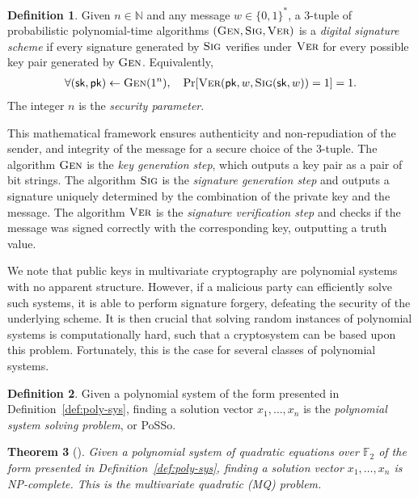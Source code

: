 \documentclass[12pt, a4paper, oneside]{memoir}
\newtheorem{theorem}{Theorem}[section]
\theoremstyle{definition}
\newtheorem{definition}[theorem]{Definition}
\begin{document}
\begin{definition}
  Given $n \in \mathbb{N}$ and any message $w \in \{0, 1\}^{*}$, a $3$-tuple of probabilistic polynomial-time algorithms $(\textsc{Gen}, \textsc{Sig}, \textsc{Ver})$ is a \emph{digital signature scheme} if every signature generated by $\textsc{Sig}$ verifies under $\textsc{Ver}$ for every possible key pair generated by $\textsc{Gen}$. Equivalently,
  \begin{align}
     \forall (\mathsf{sk}, \mathsf{pk}) \leftarrow \textsc{Gen}(1^{n}),
       \quad \Pr[\textsc{Ver}(\mathsf{pk}, w, \textsc{Sig}(\mathsf{sk}, w)) = 1] = 1.
  \end{align}
  The integer $n$ is the \emph{security parameter}.
\end{definition}

This mathematical framework ensures authenticity and non-repudiation of the sender, and integrity of the message for a secure choice of the $3$-tuple. The algorithm $\textsc{Gen}$ is the \emph{key generation step}, which outputs a key pair as a pair of bit strings. The algorithm $\textsc{Sig}$ is the \emph{signature generation step} and outputs a signature uniquely determined by the combination of the private key and the message. The algorithm $\textsc{Ver}$ is the \emph{signature verification step} and checks if the message was signed correctly with the corresponding key, outputting a truth value.

We note that public keys in multivariate cryptography are polynomial systems with no apparent structure. However, if a malicious party can efficiently solve such systems, it is able to perform signature forgery, defeating the security of the underlying scheme. It is then crucial that solving random instances of polynomial systems is computationally hard, such that a cryptosystem can be based upon this problem. Fortunately, this is the case for several classes of polynomial systems.

\begin{definition}\label{def:posso}
  Given a polynomial system of the form presented in Definition~\ref{def:poly-sys}, finding a solution vector $x_{1}, \dots, x_{n}$ is the \emph{polynomial system solving problem}, or \textsf{PoSSo}.
\end{definition}

\begin{theorem}[{\cite[App.~A]{Patarin:199711}}]
  Given a polynomial system of \emph{quadratic equations over $\mathbb{F}_{2}$} of the form presented in Definition~\ref{def:poly-sys}, finding a solution vector $x_{1}, \dots, x_{n}$ is NP-complete. This is the \emph{multivariate quadratic (MQ) problem}.
\end{theorem}
\end{document}
